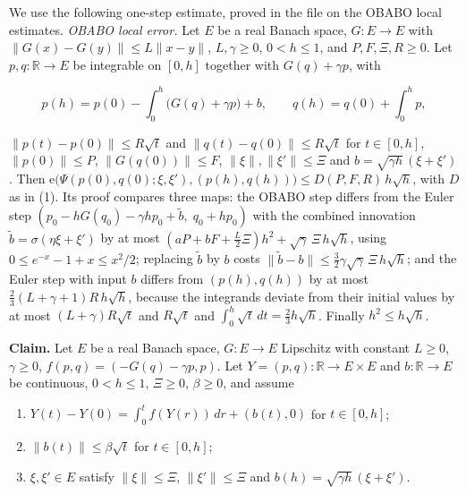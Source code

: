\documentclass[11pt,a4paper]{report}
\begin{document}
We use the following one-step estimate, proved in the file on the OBABO local estimates. \emph{OBABO local error.} Let \(E\) be a real Banach space, \(G:E\to E\) with \(\|G(x)-G(y)\|\le L\|x-y\|\), \(L,\gamma\ge0\), \(0<h\le1\), and \(P,F,\Xi,R\ge0\). Let \(p,q:\mathbb R\to E\) be integrable on \([0,h]\) together with \(G(q)+\gamma p\), with


\[p(h)=p(0)-\int_0^h\bigl(G(q)+\gamma p\bigr)+b,\qquad q(h)=q(0)+\int_0^hp,\]


\(\|p(t)-p(0)\|\le R\sqrt t\) and \(\|q(t)-q(0)\|\le R\sqrt t\) for \(t\in[0,h]\), \(\|p(0)\|\le P\), \(\|G(q(0))\|\le F\), \(\|\xi\|,\|\xi'\|\le\Xi\) and \(b=\sqrt{\gamma h}\,(\xi+\xi')\). Then \(\mathrm e\bigl(\Psi(p(0),q(0);\xi,\xi'),(p(h),q(h))\bigr)\le D(P,F,R)\,h\sqrt h\), with \(D\) as in (1). Its proof compares three maps: the OBABO step differs from the Euler step \((p_0-hG(q_0)-\gamma hp_0+\tilde b,\;q_0+hp_0)\) with the combined innovation \(\tilde b=\sigma(\eta\xi+\xi')\) by at most \((aP+bF+\tfrac L2\Xi)h^2+\sqrt\gamma\,\Xi\,h\sqrt h\), using \(0\le e^{-x}-1+x\le x^2/2\); replacing \(\tilde b\) by \(b\) costs \(\|\tilde b-b\|\le\tfrac32\gamma\sqrt\gamma\,\Xi\,h\sqrt h\); and the Euler step with input \(b\) differs from \((p(h),q(h))\) by at most \(\tfrac23(L+\gamma+1)R\,h\sqrt h\), because the integrands deviate from their initial values by at most \((L+\gamma)R\sqrt t\) and \(R\sqrt t\) and \(\int_0^h\sqrt t\,dt=\tfrac23h\sqrt h\). Finally \(h^2\le h\sqrt h\).




\textbf{Claim.} Let \(E\) be a real Banach space, \(G:E\to E\) Lipschitz with constant \(L\ge0\), \(\gamma\ge0\), \(f(p,q)=(-G(q)-\gamma p,p)\). Let \(Y=(p,q):\mathbb R\to E\times E\) and \(b:\mathbb R\to E\) be continuous, \(0<h\le1\), \(\Xi\ge0\), \(\beta\ge0\), and assume



\begin{enumerate}


\item \(Y(t)-Y(0)=\int_0^tf(Y(r))\,dr+(b(t),0)\) for \(t\in[0,h]\);

\item \(\|b(t)\|\le\beta\sqrt t\) for \(t\in[0,h]\);

\item \(\xi,\xi'\in E\) satisfy \(\|\xi\|\le\Xi\), \(\|\xi'\|\le\Xi\) and \(b(h)=\sqrt{\gamma h}\,(\xi+\xi')\).

\end{enumerate}
\end{document}
